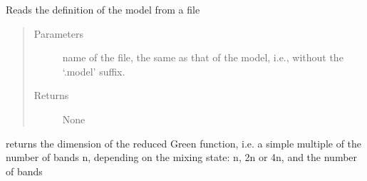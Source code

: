 \documentclass[letterpaper,10pt,english]{sphinxmanual}
\begin{document}
\begin{fulllineitems}
\label{\detokenize{functions:pyqcm.read_model}}
\sphinxAtStartPar
Reads the definition of the model from a file
\begin{quote}\begin{description}
\item[{Parameters}] \leavevmode
\sphinxAtStartPar
{} \textendash{} name of the file, the same as that of the model, i.e., without the ‘.model’ suffix.

\item[{Returns}] \leavevmode
\sphinxAtStartPar
None

\end{description}\end{quote}

\end{fulllineitems}


\begin{fulllineitems}
\label{\detokenize{functions:pyqcm.reduced_Green_function_dimension}}
\sphinxAtStartPar
returns the dimension of the reduced Green function, i.e. a simple multiple of the
number of bands n, depending on the mixing state: n, 2n or 4n, and the number of bands

\end{fulllineitems}

\end{document}
